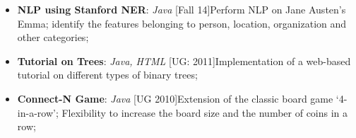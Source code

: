 \documentclass[10pt, letterpaper]{article}
\begin{document}
\begin{multicols}{2}
\begin{itemize}[nolistsep,leftmargin=*]
				\item \textbf{NLP using Stanford NER}: \textit{Java} \hfill[Fall 14]\newline Perform NLP on Jane Austen's Emma; identify the features belonging to person, location, organization and other categories; 
				\item \textbf{Tutorial on Trees}: \textit{Java, HTML} \hfill[UG: 2011]\newline Implementation of a web-based tutorial on different types of binary trees; 
				\item \textbf{Connect-N Game}: \textit{Java} \hfill [UG 2010]\newline Extension of the classic board game `4-in-a-row'; Flexibility to increase the board size and the number of coins in a row;
			\end{itemize}
		
	\end{multicols}
\end{document}
